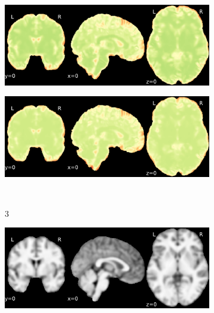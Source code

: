\documentclass{article}
\begin{document}
\begin{appendices}
\begin{landscape}
\begin{figure}
\begin{subfigure}[t]{0.2\paperheight}
            \end{subfigure}
            \begin{subfigure}[t]{0.2\paperheight}
                \centering
                \includegraphics[width=\textwidth]{figures/sig/5mm/rs_ds001771_sub-36_sig.pdf}
            \end{subfigure}
            \begin{subfigure}[t]{0.2\paperheight}
                \centering
                \includegraphics[width=\textwidth]{figures/sig/5mm/rr.rs_ds001771_sub-36_sig.pdf}
            \end{subfigure} \\
            \begin{subfigure}[b][][c]{0.01\paperwidth} 3 \vspace*{15pt} \end{subfigure}
            \begin{subfigure}[t]{0.2\paperheight}
                \centering
                \includegraphics[width=\textwidth]{figures/sig/5mm/ieee_ds000256_sub-CTS201.pdf}

\end{subfigure}
\end{figure}
\end{landscape}
\end{appendices}
\end{document}
